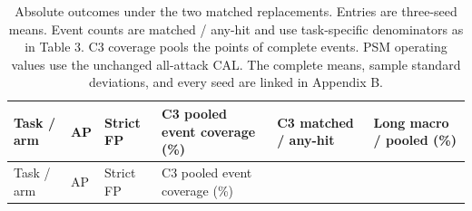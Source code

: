 \documentclass[pdflatex,sn-apa]{sn-jnl}
\begin{document}
\begin{longtable}[]{@{}
  >{\raggedright\arraybackslash}p{}
  >{\raggedleft\arraybackslash}p{}
  >{\raggedleft\arraybackslash}p{}
  >{\raggedleft\arraybackslash}p{}
  >{\raggedleft\arraybackslash}p{}
  >{\raggedleft\arraybackslash}p{}@{}}
\caption{Absolute outcomes under the two matched replacements. Entries
are three-seed means. Event counts are matched / any-hit and use
task-specific denominators as in Table 3. C3 coverage pools the points
of complete events. PSM operating values use the unchanged all-attack
CAL. The complete means, sample standard deviations, and every seed are
linked in Appendix B.}\tabularnewline
\toprule\noalign{}
\begin{minipage}[b]{\linewidth}\raggedright
Task / arm
\end{minipage} & \begin{minipage}[b]{\linewidth}\raggedleft
AP
\end{minipage} & \begin{minipage}[b]{\linewidth}\raggedleft
Strict FP
\end{minipage} & \begin{minipage}[b]{\linewidth}\raggedleft
C3 pooled event coverage (\%)
\end{minipage} & \begin{minipage}[b]{\linewidth}\raggedleft
C3 matched / any-hit
\end{minipage} & \begin{minipage}[b]{\linewidth}\raggedleft
Long macro / pooled (\%)
\end{minipage} \\
\midrule\noalign{}
\endfirsthead
\toprule\noalign{}
\begin{minipage}[b]{\linewidth}\raggedright
Task / arm
\end{minipage} & \begin{minipage}[b]{\linewidth}\raggedleft
AP
\end{minipage} & \begin{minipage}[b]{\linewidth}\raggedleft
Strict FP
\end{minipage} & \begin{minipage}[b]{\linewidth}\raggedleft
C3 pooled event coverage (\%)
\end{minipage} & \begin{minipage}[b]{\linewidth}\raggedleft

\end{minipage}
\end{longtable}
\end{document}
